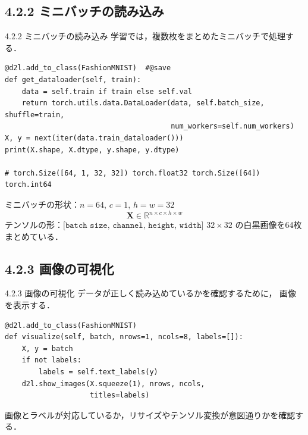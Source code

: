 \documentclass[dvipdfmx,uplatex,11pt]{beamer}
\newcommand{\key}[1]{\alert{#1}}
\begin{document}
\subsection{4.2.2 ミニバッチの読み込み}
\begin{frame}[fragile]{4.2.2 ミニバッチの読み込み}
学習では，複数枚をまとめた\key{ミニバッチ}で処理する．
\begin{lstlisting}
@d2l.add_to_class(FashionMNIST)  #@save
def get_dataloader(self, train):
    data = self.train if train else self.val
    return torch.utils.data.DataLoader(data, self.batch_size, shuffle=train,
                                       num_workers=self.num_workers)
X, y = next(iter(data.train_dataloader()))
print(X.shape, X.dtype, y.shape, y.dtype)

# torch.Size([64, 1, 32, 32]) torch.float32 torch.Size([64]) torch.int64
\end{lstlisting}
\vspace{-1em}
\begin{d2lplainbox}
  ミニバッチの形状：$n=64$, $c=1$, $h=w=32$
\[
\bm{X} \in \mathbb{R}^{n \times c \times h \times w}
\]
テンソルの形：$\texttt{[batch size, channel, height, width]}$
$32 \times 32$ の白黒画像を64枚まとめている．
\end{d2lplainbox}
\end{frame}

\subsection{4.2.3 画像の可視化}
\begin{frame}[fragile]{4.2.3 画像の可視化}
データが正しく読み込めているかを確認するために，
画像を表示する．
\begin{lstlisting}
@d2l.add_to_class(FashionMNIST)
def visualize(self, batch, nrows=1, ncols=8, labels=[]):
    X, y = batch
    if not labels:
        labels = self.text_labels(y)
    d2l.show_images(X.squeeze(1), nrows, ncols,
                    titles=labels)
\end{lstlisting}

画像とラベルが対応しているか，リサイズやテンソル変換が意図通りかを確認する．
\end{frame}
\end{document}
